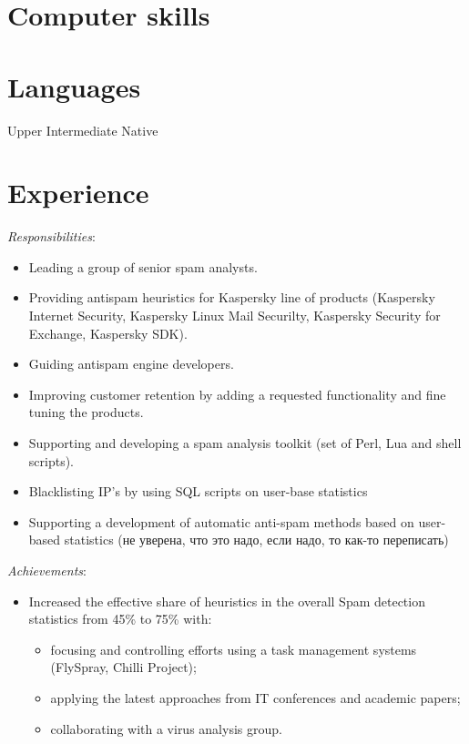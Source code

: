 \documentclass[11pt,a4paper,sans]{moderncv}        %
\newcommand{\responsibilities}[1]{ \emph{Responsibilities}:\begin{itemize} #1\end{itemize}}
\newcommand{\achievements}[1]{ \emph{Achievements}:\begin{itemize} #1\end{itemize}}
\begin{document}
\makecvtitle


\section{Computer skills}


\section{Languages}
     Upper Intermediate\hfill 
     Native \hfill 


\section{Experience}

 {
    \responsibilities {
        \item Leading a group of senior spam analysts.
        \item Providing antispam heuristics for Kaspersky line of products (Kaspersky Internet Security, Kaspersky Linux Mail Securilty, Kaspersky Security for Exchange, Kaspersky SDK).
        \item Guiding antispam engine developers.
        \item Improving customer retention by adding a requested functionality and fine tuning the products.
        \item Supporting and developing a spam analysis toolkit (set of Perl, Lua and shell scripts).
        \item Blacklisting IP's by using SQL scripts on user-base statistics
        \item Supporting a development of automatic anti-spam methods based on user-based statistics (не уверена, что это надо, если надо, то как-то переписать)
    }
    \achievements {
        \item Increased the effective share of heuristics in the overall Spam detection statistics from 45\% to 75\% with:
        \begin{itemize}
            \item focusing and controlling efforts using a task management systems (FlySpray, Chilli Project);
            \item applying the latest approaches from IT conferences and academic papers;
            \item collaborating with a virus analysis group.
        \end{itemize}
    }
}
\end{document}

